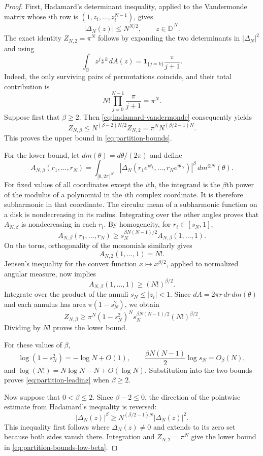 \documentclass[11pt,a4paper]{article}
\numberwithin{equation}{section}
\theoremstyle{definition}
\theoremstyle{remark}
\begin{document}
\begin{proof}
First, Hadamard's determinant inequality, applied to the Vandermonde matrix
whose $i$th row is $(1,z_i,\ldots,z_i^{N-1})$, gives
\begin{equation}
 |\Delta_N(z)|\leq N^{N/2},\qquad z\in\overline{\mathbb D}^{\,N}.
 \label{eq:hadamard-vandermonde}
\end{equation}
The exact identity $Z_{N,2}=\pi^N$ follows by expanding the two determinants
in $|\Delta_N|^2$ and using
\[
 \int_{\mathbb D}z^j\overline z^{\,k}\,dA(z)
 =\boldsymbol 1_{\{j=k\}}\frac\pi{j+1}.
\]
Indeed, the only surviving pairs of permutations coincide, and their total
contribution is
\[
 N!\prod_{j=0}^{N-1}\frac\pi{j+1}=\pi^N.
\]
Suppose first that $\beta\geq2$.  Then
\eqref{eq:hadamard-vandermonde} consequently yields
\[
 Z_{N,\beta}
 \leq N^{(\beta-2)N/2} Z_{N,2}
 =\pi^N N^{(\beta/2-1)N}.
\]
This proves the upper bound in \eqref{eq:partition-bounds}.

For the lower bound, let $dm(\theta)=d\theta/(2\pi)$ and define
\[
 A_{N,\beta}(r_1,\ldots,r_N)
 =\int_{[0,2\pi)^N}
 |\Delta_N(r_1e^{i\theta_1},\ldots,r_Ne^{i\theta_N})|^\beta
 \,dm^{\otimes N}(\theta).
\]
For fixed values of all coordinates except the $i$th, the integrand is
the $\beta$th power of the modulus of a polynomial in the $i$th complex
coordinate.  It is therefore subharmonic in that coordinate.  The circular
mean of a subharmonic function on a disk is nondecreasing in its radius.
Integrating over the other angles proves that $A_{N,\beta}$ is
nondecreasing in each $r_i$.  By homogeneity, for $r_i\in[s_N,1]$,
\[
 A_{N,\beta}(r_1,\ldots,r_N)
 \geq s_N^{\beta N(N-1)/2}A_{N,\beta}(1,\ldots,1).
\]
On the torus, orthogonality of the monomials similarly gives
\[
 A_{N,2}(1,\ldots,1)=N!.
\]
Jensen's inequality for the convex function $x\mapsto x^{\beta/2}$,
applied to normalized angular measure, now implies
\[
 A_{N,\beta}(1,\ldots,1)\geq(N!)^{\beta/2}.
\]
Integrate over the product of the annuli $s_N\leq|z_i|<1$.  Since
$dA=2\pi r\,dr\,dm(\theta)$ and each annulus has area
$\pi(1-s_N^2)$, we obtain
\[
 Z_{N,\beta}
 \geq \pi^N(1-s_N^2)^N
        s_N^{\beta N(N-1)/2}(N!)^{\beta/2}.
\]
Dividing by $N!$ proves the lower bound.

For these values of $\beta$,
\[
 \log(1-s_N^2)=-\log N+O(1),\qquad
 \frac{\beta N(N-1)}2\log s_N=O_\beta(N),
\]
and $\log(N!)=N\log N-N+O(\log N)$.  Substitution into the two bounds
proves \eqref{eq:partition-leading} when $\beta\geq2$.

Now suppose that $0<\beta\leq2$.  Since $\beta-2\leq0$, the direction
of the pointwise estimate from Hadamard's inequality is reversed:
\[
 |\Delta_N(z)|^\beta
 \geq N^{(\beta/2-1)N}|\Delta_N(z)|^2.
\]
This inequality first follows where $\Delta_N(z)\ne0$ and extends to its
zero set because both sides vanish there.  Integration and $Z_{N,2}=\pi^N$
give the lower bound in \eqref{eq:partition-bounds-low-beta}.


\end{proof}
\end{document}
